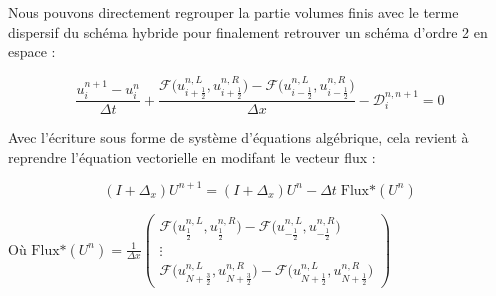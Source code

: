 

Nous pouvons directement regrouper la partie volumes finis avec le terme dispersif du schéma hybride pour finalement retrouver un schéma d'ordre 2 en espace : 

$$ \frac{u_i^{n+1} - u_i^n}{\Delta t} + \frac{\mathcal{F}\Big(u_{i + \frac{1}{2}}^{n,L},u_{i + \frac{1}{2}}^{n,R}\Big) - \mathcal{F}\Big(u_{i - \frac{1}{2}}^{n,L},u_{i - \frac{1}{2}}^{n,R}\Big)}{\Delta x} - \mathcal{D}_i^{n,n+1} = 0 $$

Avec l'écriture sous forme de système d'équations algébrique, cela revient à reprendre l'équation vectorielle en modifant le vecteur flux :

$$(I + \Delta_x)U^{n+1} = (I + \Delta_x)U^n - \Delta t \; \text{Flux*}(U^n)$$

\vspace{1em}

Où $\text{Flux*}(U^n) = \frac{1}{\Delta x}
\begin{pmatrix}
    \mathcal{F}\Big(u_{\frac{1}{2}}^{n,L},u_{\frac{1}{2}}^{n,R}\Big) - \mathcal{F}\Big(u_{- \frac{1}{2}}^{n,L},u_{- \frac{1}{2}}^{n,R}\Big) \\
    \vdots \\
    \mathcal{F}\Big(u_{N + \frac{3}{2}}^{n,L},u_{N + \frac{3}{2}}^{n,R}\Big) - \mathcal{F}\Big(u_{N + \frac{1}{2}}^{n,L},u_{N + \frac{1}{2}}^{n,R}\Big)
\end{pmatrix}$

\vspace{1em}

